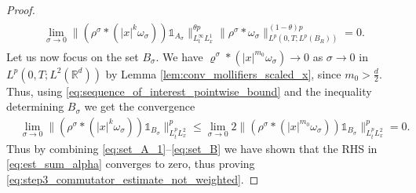 \documentclass[reqno, 11pt]{amsart}
\numberwithin{equation}{section}
\theoremstyle{definition}
\begin{document}
\begin{proof}
    \begin{align}
        \label{eq:set_A_3}
        \begin{split}
            \lim_{\sigma\to 0}
            \|(\rho^\sigma\ast(|x|^k\omega_\sigma))\mathds{1}_{A_\sigma}\|_{L_t^\infty L_x^1}^{\theta p}
            \|\rho^\sigma\ast\omega_\sigma\|_{L^p(0,T;L^p(B_R))}^{(1-\theta)p}
            =0.
        \end{split}
    \end{align}
    Let us now focus on the set $B_\sigma$. We have $\varrho^\sigma \ast (|x|^{m_0} \omega_\sigma) \to 0$ as $\sigma \to 0$ in $L^p(0,T; L^2(\mathbb{R}^d))$ by Lemma \ref{lem:conv_mollifiers_scaled_x}, since $m_0> \frac{d}{2}$. Thus, using \eqref{eq:sequence_of_interest_pointwise_bound} and the inequality determining  $B_\sigma$ we get the convergence
    \begin{align}
        \label{eq:set_B}
        &\lim_{\sigma\to 0}\|(\rho^\sigma\ast(|x|^k\omega_\sigma))\mathds{1}_{B_\sigma}\|_{L_t^p L_x^2}^p
        \leq \lim_{\sigma\to 0}2\|(\rho^\sigma\ast(|x|^{m_0}\omega_\sigma))\mathds{1}_{B_\sigma}\|_{L_t^p L_x^2}^p
        =0.
    \end{align}
    Thus by combining \eqref{eq:set_A_1}--\eqref{eq:set_B} we have shown that the RHS in \eqref{eq:est_sum_alpha} converges to zero, thus proving \eqref{eq:step3_commutator_estimate_not_weighted}.
    
    \smallskip
    

\end{proof}
\end{document}
